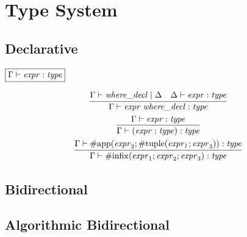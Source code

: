 \section{Type System}

\subsection{Declarative}

$\fbox{$\Gamma \vdash \mathit{expr}: \mathit{type}$}$

\begin{gather*}
    \infer{\Gamma \vdash \mathit{expr}\; \mathit{where\_decl}: \mathit{type}}{
        \Gamma \vdash \mathit{where\_decl} \mid \Delta
        &
        \Delta \vdash \mathit{expr}: \mathit{type}
    }
    \\
    \infer{\Gamma \vdash (\mathit{expr}: \mathit{type}): \mathit{type}}{
        \Gamma \vdash \mathit{expr}: \mathit{type}
    }
    \\
    \infer{\Gamma \vdash \mathrm{\#infix}(\mathit{expr}_1; \mathit{expr}_2; \mathit{expr}_3): \mathit{type}}{
        \Gamma \vdash \mathrm{\#app}(\mathit{expr}_2; \mathrm{\#tuple}(\mathit{expr_1}; \mathit{expr}_3)): \mathit{type}
    }
\end{gather*}

\subsection{Bidirectional}

\subsection{Algorithmic Bidirectional}
